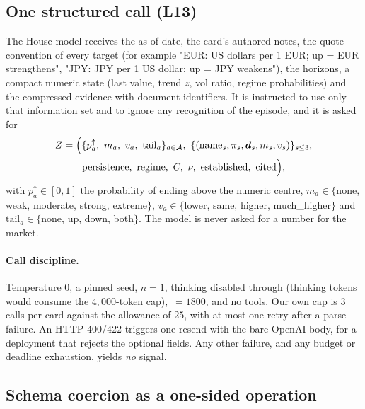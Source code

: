\subsection{One structured call (L13)}

The House model receives the as-of date, the card's authored notes, the quote convention of every target (for example "EUR: US dollars per
1 EUR; up = EUR strengthens", "JPY: JPY per 1 US dollar; up = JPY weakens"), the horizons, a compact numeric state (last value, trend $z$, vol ratio,
regime probabilities) and the compressed evidence with document identifiers. It is instructed to use only that information set and to ignore any
recognition of the episode, and it is asked for
\begin{multline}
  Z=\Bigl(\{p^{\uparrow}_a,\ m_a,\ v_a,\ \text{tail}_a\}_{a\in\mathcal A},\ \{(\text{name}_s,\pi_s,\bm d_s,m_s,v_s)\}_{s\le3},\\
  \text{persistence},\ \text{regime},\ C,\ \nu,\ \text{established},\ \text{cited}\Bigr),
\end{multline}
with $p^\uparrow_a\in[0,1]$ the probability of ending above the numeric centre, $m_a\in\{$none, weak, moderate, strong, extreme$\}$,
$v_a\in\{$lower, same, higher, much\_higher$\}$ and $\text{tail}_a\in\{$none, up, down, both$\}$. The model is never asked for a number for
the market.

\paragraph{Call discipline.} Temperature $0$, a pinned seed, $n=1$, thinking disabled through  (thinking tokens
would consume the $4{,}000$-token cap), $\,=1800$, and no tools. Our own cap is $3$ calls per card against the allowance of $25$,
with at most one retry after a parse failure. An HTTP $400$/$422$ triggers one resend with the bare OpenAI body, for a deployment that rejects the
optional fields. Any other failure, and any budget or deadline exhaustion, yields \emph{no} signal.

\subsection{Schema coercion as a one-sided operation}

